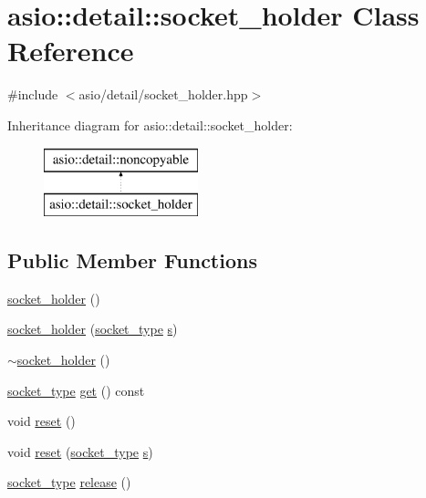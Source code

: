 \hypertarget{classasio_1_1detail_1_1socket__holder}{}\section{asio\+:\+:detail\+:\+:socket\+\_\+holder Class Reference}
\label{classasio_1_1detail_1_1socket__holder}


{\ttfamily \#include $<$asio/detail/socket\+\_\+holder.\+hpp$>$}

Inheritance diagram for asio\+:\+:detail\+:\+:socket\+\_\+holder\+:\begin{figure}[H]
\begin{center}
\leavevmode
\includegraphics[height=2.000000cm]{classasio_1_1detail_1_1socket__holder}
\end{center}
\end{figure}
\subsection*{Public Member Functions}
\begin{DoxyCompactItemize}
\item 
\hyperlink{classasio_1_1detail_1_1socket__holder_a583c364271fa74a8292ec472009b1f40}{socket\+\_\+holder} ()
\item 
\hyperlink{classasio_1_1detail_1_1socket__holder_aecdb304341764151be2fee5d4548b7f1}{socket\+\_\+holder} (\hyperlink{namespaceasio_1_1detail_a6798c771dd84b79798b1a08150706ea9}{socket\+\_\+type} \hyperlink{group__async__connect_ga31ab74b9ea6c77932dddd016cfc7920a}{s})
\item 
\hyperlink{classasio_1_1detail_1_1socket__holder_ac20e117ae3baf80cce93c4deef2af2c5}{$\sim$socket\+\_\+holder} ()
\item 
\hyperlink{namespaceasio_1_1detail_a6798c771dd84b79798b1a08150706ea9}{socket\+\_\+type} \hyperlink{classasio_1_1detail_1_1socket__holder_acce8183ec40b137b333b0818724f750c}{get} () const 
\item 
void \hyperlink{classasio_1_1detail_1_1socket__holder_a769000b0737ed610487ac9f490e77519}{reset} ()
\item 
void \hyperlink{classasio_1_1detail_1_1socket__holder_ad025c1aacfd7186cf7a91cef7192b057}{reset} (\hyperlink{namespaceasio_1_1detail_a6798c771dd84b79798b1a08150706ea9}{socket\+\_\+type} \hyperlink{group__async__connect_ga31ab74b9ea6c77932dddd016cfc7920a}{s})
\item 
\hyperlink{namespaceasio_1_1detail_a6798c771dd84b79798b1a08150706ea9}{socket\+\_\+type} \hyperlink{classasio_1_1detail_1_1socket__holder_a319df4e1320692ff28e71b9601a42a8a}{release} ()
\end{DoxyCompactItemize}


